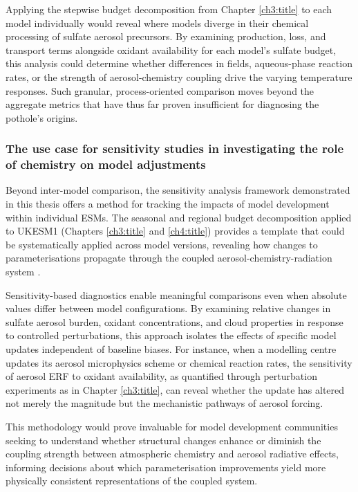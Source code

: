 Applying the stepwise budget decomposition from Chapter \ref{ch3:title} to each model individually would reveal where models diverge in their chemical processing of sulfate aerosol precursors. By examining production, loss, and transport terms alongside oxidant availability for each model's sulfate budget, this analysis could determine whether differences in  fields, aqueous-phase reaction rates, or the strength of aerosol-chemistry coupling drive the varying temperature responses. Such granular, process-oriented comparison moves beyond the aggregate metrics that have thus far proven insufficient for diagnosing the pothole's origins.

\subsubsection{The use case for sensitivity studies in investigating the role of chemistry on model adjustments}

Beyond inter-model comparison, the sensitivity analysis framework demonstrated in this thesis offers a method for tracking the impacts of model development within individual ESMs. The seasonal and regional budget decomposition applied to UKESM1 (Chapters \ref{ch3:title} and \ref{ch4:title}) provides a template that could be systematically applied across model versions, revealing how changes to parameterisations propagate through the coupled aerosol-chemistry-radiation system \citep[][]{bellouinBoundingGlobalAerosol2020}.

Sensitivity-based diagnostics enable meaningful comparisons even when absolute values differ between model configurations. By examining relative changes in sulfate aerosol burden, oxidant concentrations, and cloud properties in response to controlled perturbations, this approach isolates the effects of specific model updates independent of baseline biases. For instance, when a modelling centre updates its aerosol microphysics scheme or chemical reaction rates, the sensitivity of aerosol ERF to oxidant availability, as quantified through perturbation experiments as in Chapter \ref{ch3:title}, can reveal whether the update has altered not merely the magnitude but the mechanistic pathways of aerosol forcing. 

This methodology would prove invaluable for model development communities seeking to understand whether structural changes enhance or diminish the coupling strength between atmospheric chemistry and aerosol radiative effects, informing decisions about which parameterisation improvements yield more physically consistent representations of the coupled system.